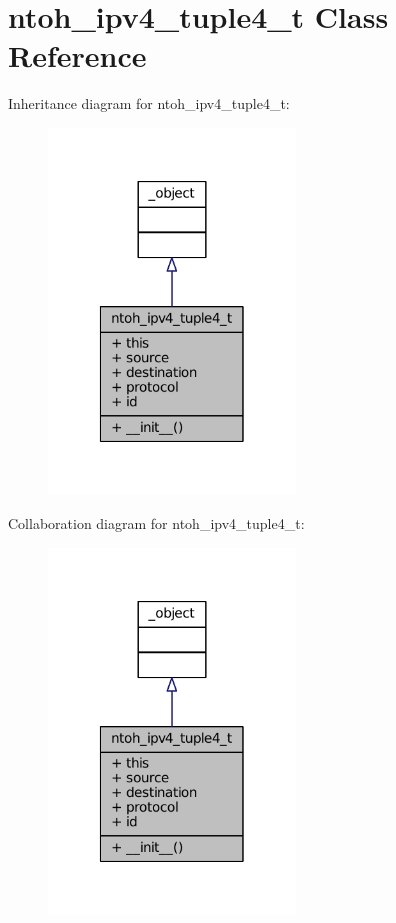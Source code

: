 \hypertarget{classlibntoh_1_1ntoh__ipv4__tuple4__t}{\section{ntoh\-\_\-ipv4\-\_\-tuple4\-\_\-t Class Reference}
\label{classlibntoh_1_1ntoh__ipv4__tuple4__t}
}


Inheritance diagram for ntoh\-\_\-ipv4\-\_\-tuple4\-\_\-t\-:
\nopagebreak
\begin{figure}[H]
\begin{center}
\leavevmode
\includegraphics[width=186pt]{classlibntoh_1_1ntoh__ipv4__tuple4__t__inherit__graph}
\end{center}
\end{figure}


Collaboration diagram for ntoh\-\_\-ipv4\-\_\-tuple4\-\_\-t\-:
\nopagebreak
\begin{figure}[H]
\begin{center}
\leavevmode
\includegraphics[width=186pt]{classlibntoh_1_1ntoh__ipv4__tuple4__t__coll__graph}
\end{center}
\end{figure}
